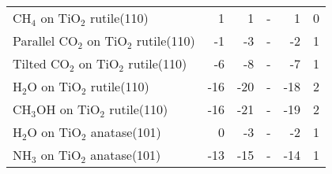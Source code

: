 \begin{table}[h]
\begin{adjustbox}{center,max width=1\textwidth}
\begin{tabular}{lrrrrr}
CH$_4$ on TiO$_2$ rutile(110) & 1 & 1 & - & 1 & 0 \\
Parallel CO$_2$ on TiO$_2$ rutile(110) & -1 & -3 & - & -2 & 1 \\
Tilted CO$_2$ on TiO$_2$ rutile(110) & -6 & -8 & - & -7 & 1 \\
H$_2$O on TiO$_2$ rutile(110) & -16 & -20 & - & -18 & 2 \\
CH$_3$OH on TiO$_2$ rutile(110) & -16 & -21 & - & -19 & 2 \\
H$_2$O on TiO$_2$ anatase(101) & 0 & -3 & - & -2 & 1 \\
NH$_3$ on TiO$_2$ anatase(101) & -13 & -15 & - & -14 & 1 \\
\bottomrule
\end{tabular}
\end{adjustbox}
\end{table}